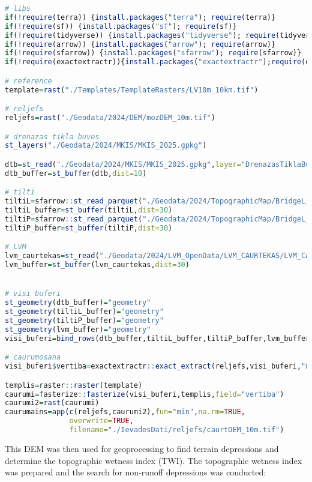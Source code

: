 \documentclass[
]{book}
\begin{document}
\begin{lstlisting}[language=R]
# libs
if(!require(terra)) {install.packages("terra"); require(terra)}
if(!require(sf)) {install.packages("sf"); require(sf)}
if(!require(tidyverse)) {install.packages("tidyverse"); require(tidyverse)}
if(!require(arrow)) {install.packages("arrow"); require(arrow)}
if(!require(sfarrow)) {install.packages("sfarrow"); require(sfarrow)}
if(!require(exactextractr)){install.packages("exactextractr");require(exactextractr)}

# reference
template=rast("./Templates/TemplateRasters/LV10m_10km.tif")

# reljefs
reljefs=rast("./Geodata/2024/DEM/mozDEM_10m.tif")

# drenazas tikla buves
st_layers("./Geodata/2024/MKIS/MKIS_2025.gpkg")

dtb=st_read("./Geodata/2024/MKIS/MKIS_2025.gpkg",layer="DrenazasTiklaBuves")
dtb_buffer=st_buffer(dtb,dist=10)

# tilti 
tiltiL=sfarrow::st_read_parquet("./Geodata/2024/TopographicMap/BridgeL_COMB.parquet")
tiltiL_buffer=st_buffer(tiltiL,dist=30)
tiltiP=sfarrow::st_read_parquet("./Geodata/2024/TopographicMap/BridgeL_COMB.parquet")
tiltiP_buffer=st_buffer(tiltiP,dist=30)

# LVM
lvm_caurtekas=st_read("./Geodata/2024/LVM_OpenData/LVM_CAURTEKAS/LVM_CAURTEKAS_Shape.shp")
lvm_buffer=st_buffer(lvm_caurtekas,dist=30)


# visi buferi 
st_geometry(dtb_buffer)="geometry"
st_geometry(tiltiL_buffer)="geometry"
st_geometry(tiltiP_buffer)="geometry"
st_geometry(lvm_buffer)="geometry"
visi_buferi=bind_rows(dtb_buffer,tiltiL_buffer,tiltiP_buffer,lvm_buffer)

# caurumosana
visi_buferi$vertiba=exactextractr::exact_extract(reljefs,visi_buferi,"min")

templis=raster::raster(template)
caurumi=fasterize::fasterize(visi_buferi,templis,field="vertiba")
caurumi2=rast(caurumi)
caurumains=app(c(reljefs,caurumi2),fun="min",na.rm=TRUE,
               overwrite=TRUE,
               filename="./IevadesDati/reljefs/caurtDEM_10m.tif")
\end{lstlisting}

This DEM was then used for geoprocessing to find terrain depressions and
determine the topographic wetness index (TWI). The topographic
wetness index was prepared and the search for non-runoff depressions was conducted:
\end{document}
